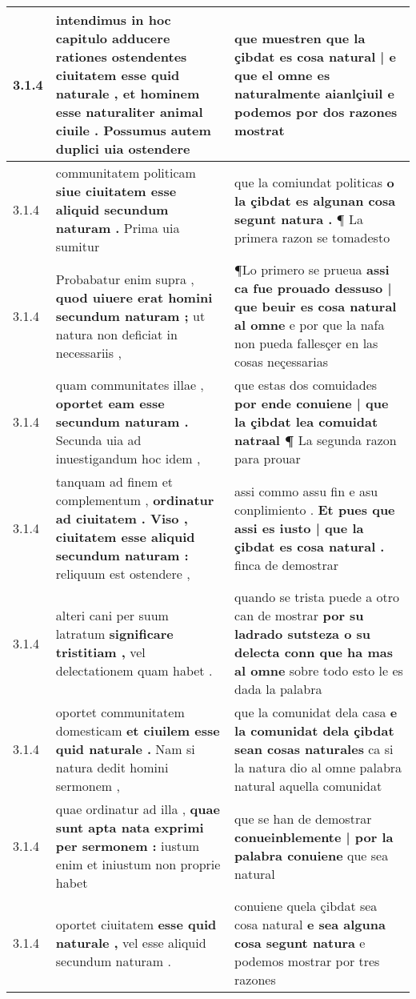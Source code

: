 \begin{tabular}{|p{1cm}|p{6.5cm}|p{6.5cm}|}
3.1.4 & intendimus in hoc capitulo adducere rationes ostendentes ciuitatem esse quid naturale , \textbf{ et hominem esse naturaliter animal ciuile . } Possumus autem duplici uia ostendere & que muestren \textbf{ que la çibdat es cosa natural | e que el omne es naturalmente aianlçiuil } e podemos por dos razones mostrat \\\hline
3.1.4 & communitatem politicam \textbf{ siue ciuitatem esse aliquid secundum naturam . } Prima uia sumitur & que la comiundat politicas \textbf{ o la çibdat es algunan cosa segunt natura . } ¶ La primera razon se tomadesto \\\hline
3.1.4 & Probabatur enim supra , \textbf{ quod uiuere erat homini secundum naturam ; } ut natura non deficiat in necessariis , & ¶Lo primero se prueua \textbf{ assi ca fue prouado dessuso | que beuir es cosa natural al omne } e por que la nafa non pueda fallesçer en las cosas neçessarias \\\hline
3.1.4 & quam communitates illae , \textbf{ oportet eam esse secundum naturam . } Secunda uia ad inuestigandum hoc idem , & que estas dos comuidades \textbf{ por ende conuiene | que la çibdat lea comuidat natraal ¶ } La segunda razon para prouar \\\hline
3.1.4 & tanquam ad finem et complementum , \textbf{ ordinatur ad ciuitatem . Viso , ciuitatem esse aliquid secundum naturam : } reliquum est ostendere , & assi commo assu fin e asu conplimiento . \textbf{ Et pues que assi es iusto | que la çibdat es cosa natural . } finca de demostrar \\\hline
3.1.4 & alteri cani per suum latratum \textbf{ significare tristitiam , } vel delectationem quam habet . & quando se trista puede a otro can de mostrar \textbf{ por su ladrado sutsteza o su delecta conn que ha mas al omne } sobre todo esto le es dada la palabra \\\hline
3.1.4 & oportet communitatem domesticam \textbf{ et ciuilem esse quid naturale . } Nam si natura dedit homini sermonem , & que la comunidat dela casa \textbf{ e la comunidat dela çibdat sean cosas naturales } ca si la natura dio al omne palabra natural aquella comunidat \\\hline
3.1.4 & quae ordinatur ad illa , \textbf{ quae sunt apta nata exprimi per sermonem : } iustum enim et iniustum non proprie habet & que se han de demostrar \textbf{ conueinblemente | por la palabra conuiene } que sea natural \\\hline
3.1.4 & oportet ciuitatem \textbf{ esse quid naturale , } vel esse aliquid secundum naturam . & conuiene quela çibdat sea cosa natural \textbf{ e sea alguna cosa segunt natura } e podemos mostrar por tres razones \\\hline

\end{tabular}
